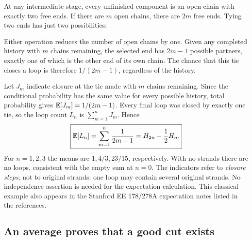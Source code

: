At any intermediate stage, every unfinished component is an open chain
with exactly two free ends. If there are $m$ open chains, there are
$2m$ free ends. Tying two ends has just two possibilities:

\begin{center}
\end{center}

Either operation reduces the number of open chains by one. Given any
completed history with $m$ chains remaining, the selected end has
$2m-1$ possible partners, exactly one of which is the other end of
its own chain. The chance that this tie closes a loop is therefore
$1/(2m-1)$, regardless of the history.

Let $J_m$ indicate closure at the tie made with $m$ chains remaining.
Since the conditional probability has the same value for every possible
history, total probability gives $\mathbb E[J_m]=1/(2m-1)$.
Every final loop was closed by exactly one tie, so the loop count $L_n$ is
$\sum_{m=1}^nJ_m$. Hence
\[
\boxed{\mathbb E[L_n]=\sum_{m=1}^n\frac1{2m-1}
=H_{2n}-\frac12H_n.}
\]
For $n=1,2,3$ the means are $1,4/3,23/15$, respectively. With no
strands there are no loops, consistent with the empty sum at $n=0$.
The indicators refer to \emph{closure steps}, not to original strands:
one loop may contain several original strands. No independence assertion
is needed for the expectation calculation. This classical example also
appears in the Stanford EE 178/278A expectation notes listed in the references.

\subsection{An average proves that a good cut exists}
\label{sec:random-cut}

